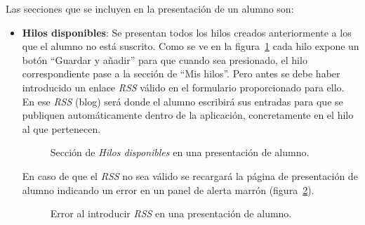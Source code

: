 \documentclass[a4paper, 12pt]{book}
\begin{document}
Las secciones que se incluyen en la presentaci\'on de un alumno son:

\begin{itemize}
  \item {\bfseries Hilos disponibles}: Se presentan todos los hilos creados anteriormente a los que el alumno no est\'a suscrito. Como se ve en la 
  figura~\ref{figura:alumno1} cada hilo expone un bot\'on ``Guardar y a\~nadir'' para que cuando sea presionado, el hilo correspondiente pase a la 
  secci\'on de ``Mis hilos''. Pero antes se debe haber introducido un enlace \textit{RSS} v\'alido en el formulario proporcionado para ello. En ese 
  \textit{RSS} (blog) ser\'a donde el alumno escribir\'a sus entradas para que se publiquen autom\'aticamente dentro de la aplicaci\'on, concretamente
  en el hilo al que pertenecen.
  \begin{figure}[htbp] 
    \centering
    \caption{Secci\'on de \textit{Hilos disponibles} en una presentaci\'on de alumno.}
    \label{figura:alumno1}
  \end{figure}
  
  En caso de que el \textit{RSS} no sea v\'alido se recargar\'a la p\'agina de presentaci\'on de alumno indicando un error en un panel de alerta marr\'on 
  (figura~\ref{figura:alumno2}).
  \begin{figure}[htbp] 
    \centering
    \caption{Error al introducir \textit{RSS} en una presentaci\'on de alumno.}
    \label{figura:alumno2}
  \end{figure}
  

\end{itemize}
\end{document}
